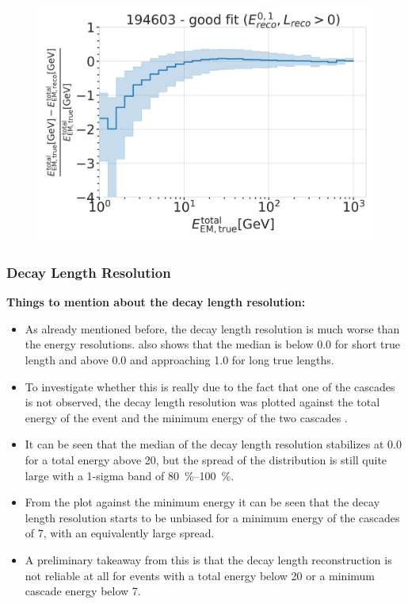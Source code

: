 \begin{figure}[h]
	\centering
    \includegraphics{figures/model_independent_simulation/results/realistic/resolutions/194603_fractional_reco_total_energy_error_goodfit.png}
    \caption[]{}
\end{figure}


\subsubsection{Decay Length Resolution}

\textbf{Things to mention about the decay length resolution:}
\begin{itemize}
    \item As already mentioned before, the decay length resolution is much worse than the energy resolutions.  also shows that the median is below 0.0 for short true length and above 0.0 and approaching 1.0 for long true lengths.
    \item To investigate whether this is really due to the fact that one of the cascades is not observed, the decay length resolution was plotted against the total energy of the event and the minimum energy of the two cascades .
    \item It can be seen that the median of the decay length resolution stabilizes at 0.0 for a total energy above \SI{20}{\gev}, but the spread of the distribution is still quite large with a 1-sigma band of \SIrange{80}{100}{\percent}.
    \item From the plot against the minimum energy it can be seen that the decay length resolution starts to be unbiased for a minimum energy of the cascades of \SI{7}{\gev}, with an equivalently large spread.
    \item A preliminary takeaway from this is that the decay length reconstruction is not reliable at all for events with a total energy below \SI{20}{\gev} or a minimum cascade energy below \SI{7}{\gev}.
\end{itemize}

